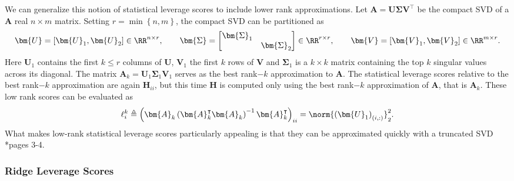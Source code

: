 We can generalize this notion of statistical leverage scores to include lower rank approximations. Let $\bm{A} = \bm{U} \bm{\Sigma} \bm{V}^{\intercal}$ be the compact SVD of a $\bm{A}$ real $n \times m$ matrix. Setting $r = \min \left\{ n,m \right\}$, the compact SVD can be partitioned as
\begin{equation*}
    \bm{U} = \left[ \bm{U}_1 , \bm{U}_2 \right] \in \RR^{n \times r}, \qquad \bm{\Sigma} =
    \begin{bmatrix}
        \bm{\Sigma}_1 &               \\
                      & \bm{\Sigma}_2
    \end{bmatrix}
    \in \RR^{r \times r},
    \qquad
    \bm{V} = \left[ \bm{V}_1 , \bm{V}_2 \right] \in \RR^{m \times r}.
\end{equation*}
Here $\bm{U}_1$ contains the first $k \leq r$ columns of $\bm{U}$, $\bm{V}_1$ the first $k$ rows of $\bm{V}$ and $\bm{\Sigma}_1$ is a $k \times k$ matrix containing the top $k$ singular values across its diagonal. The matrix $\bm{A}_k = \bm{U}_1 \bm{\Sigma}_1 \bm{V}_1$ serves as the best rank$-k$ approximation to $\bm{A}$. The statistical leverage scores relative to the best rank$-k$ approximation are again $\bm{H}_{ii}$, but this time $\bm{H}$ is computed only using the best rank$-k$ approximation of $\bm{A}$, that is $\bm{A}_k$. These low rank scores can be evaluated as
\begin{equation*} \label{eq: lev-scrs-1}
    \ell_i^k \triangleq \left( \bm{A}_{k} \left( \bm{A}_{k}^{\intercal} \bm{A}_{k} \right)^{-1} \bm{A}_{k}^{\intercal} \right)_{ii} = \norm{\left( \bm{U}_1 \right)_{(i,:)}}_2^2.
\end{equation*}
What makes low-rank statistical leverage scores particularly appealing is that they can be approximated quickly with a truncated SVD \cite{DBLP:journals/corr/abs-1303-1849}*{pages 3-4}.

\subsubsection{Ridge Leverage Scores}

